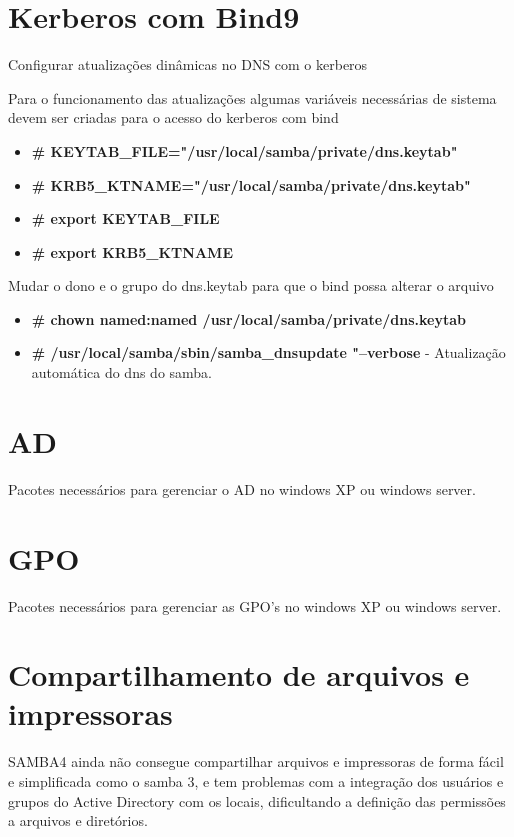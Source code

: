 \section{Kerberos com Bind9}

Configurar atualizações dinâmicas no DNS com o kerberos

Para o funcionamento das atualizações algumas variáveis necessárias de sistema devem ser criadas para o acesso do kerberos com bind

\begin{itemize}
	\item \textbf{\# KEYTAB\_FILE="/usr/local/samba/private/dns.keytab"}
	\item \textbf{\# KRB5\_KTNAME="/usr/local/samba/private/dns.keytab"}
	\item \textbf{\# export KEYTAB\_FILE}
	\item \textbf{\# export KRB5\_KTNAME}
\end{itemize}

Mudar o dono e o grupo do dns.keytab para que o bind possa alterar o arquivo

\begin{itemize}
	\item \textbf{\# chown named:named /usr/local/samba/private/dns.keytab}
	\item \textbf{\# /usr/local/samba/sbin/samba\_dnsupdate "--verbose} - Atualização automática do dns do samba.
\end{itemize}

\section{AD}

Pacotes necessários para gerenciar o AD no windows XP ou windows server.

\section{GPO}

Pacotes necessários para gerenciar as GPO's no windows XP ou windows server.

\section{Compartilhamento de arquivos e impressoras}

SAMBA4 ainda não consegue compartilhar arquivos e impressoras de forma fácil e simplificada como o samba 3, e tem problemas com a integração dos usuários e grupos do Active Directory com os locais, dificultando a definição das permissões a arquivos e diretórios.

